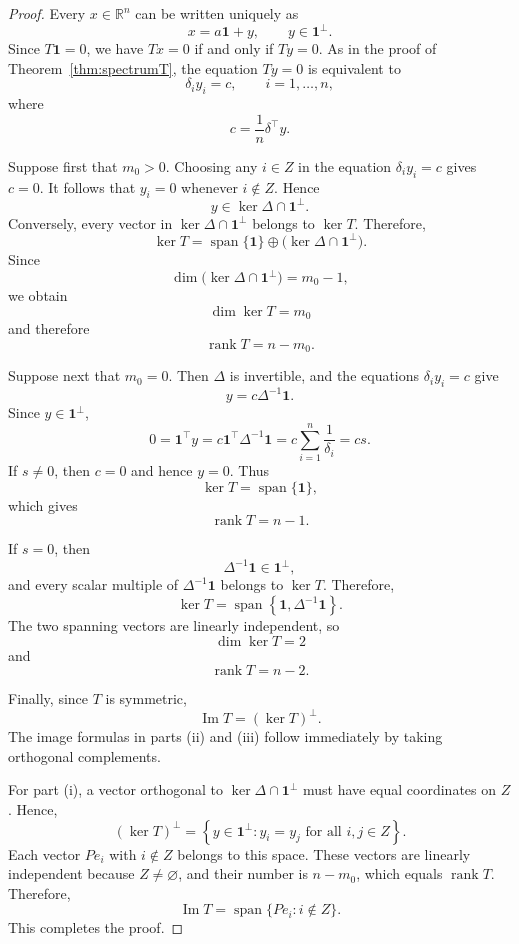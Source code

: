 \documentclass[12pt,a4paper]{amsart}
\theoremstyle{remark}
\theoremstyle{definition}
\newcommand{\1}{\mathbf{1}}
\newcommand{\0}{\mathbf{0}}
\begin{document}
\begin{proof}
Every $x\in\mathbb{R}^n$ can be written uniquely as
\[
x=a\mathbf{1}+y,
\qquad
y\in\mathbf{1}^{\perp}.
\]
Since $T\mathbf{1}=0$, we have $Tx=0$ if and only if $Ty=0$.
As in the proof of Theorem~\ref{thm:spectrumT}, the equation $Ty=0$
is equivalent to
\[
\delta_i y_i=c,
\qquad
i=1,\ldots,n,
\]
where
\[
c=\frac{1}{n}\delta^{\top}y.
\]

Suppose first that $m_0>0$. Choosing any $i\in Z$ in the equation
$\delta_i y_i=c$ gives $c=0$. It follows that $y_i=0$ whenever
$i\notin Z$. Hence
\[
y\in\ker\Delta\cap\mathbf{1}^{\perp}.
\]
Conversely, every vector in
$\ker\Delta\cap\mathbf{1}^{\perp}$ belongs to $\ker T$. Therefore,
\[
\ker T
=
\operatorname{span}\{\mathbf{1}\}
\oplus
\bigl(\ker\Delta\cap\mathbf{1}^{\perp}\bigr).
\]
Since
\[
\dim\bigl(\ker\Delta\cap\mathbf{1}^{\perp}\bigr)=m_0-1,
\]
we obtain
\[
\dim\ker T=m_0
\]
and therefore
\[
\operatorname{rank}T=n-m_0.
\]

Suppose next that $m_0=0$. Then $\Delta$ is invertible, and the
equations $\delta_i y_i=c$ give
\[
y=c\Delta^{-1}\mathbf{1}.
\]
Since $y\in\mathbf{1}^{\perp}$,
\[
0
=
\mathbf{1}^{\top}y
=
c\mathbf{1}^{\top}\Delta^{-1}\mathbf{1}
=
c\sum_{i=1}^{n}\frac{1}{\delta_i}
=
cs.
\]
If $s\neq 0$, then $c=0$ and hence $y=0$. Thus
\[
\ker T=\operatorname{span}\{\mathbf{1}\},
\]
which gives
\[
\operatorname{rank}T=n-1.
\]

If $s=0$, then
\[
\Delta^{-1}\mathbf{1}\in\mathbf{1}^{\perp},
\]
and every scalar multiple of $\Delta^{-1}\mathbf{1}$ belongs to
$\ker T$. Therefore,
\[
\ker T
=
\operatorname{span}
\left\{
\mathbf{1},\Delta^{-1}\mathbf{1}
\right\}.
\]
The two spanning vectors are linearly independent, so
\[
\dim\ker T=2
\]
and
\[
\operatorname{rank}T=n-2.
\]

Finally, since $T$ is symmetric,
\[
\operatorname{Im}T=(\ker T)^{\perp}.
\]
The image formulas in parts \textup{(ii)} and \textup{(iii)} follow
immediately by taking orthogonal complements.

For part \textup{(i)}, a vector orthogonal to
$\ker\Delta\cap\mathbf{1}^{\perp}$ must have equal coordinates on
$Z$. Hence,
\[
(\ker T)^{\perp}
=
\left\{
y\in\mathbf{1}^{\perp}:
y_i=y_j\text{ for all }i,j\in Z
\right\}.
\]
Each vector $Pe_i$ with $i\notin Z$ belongs to this space. These
vectors are linearly independent because $Z\neq\varnothing$, and
their number is $n-m_0$, which equals $\operatorname{rank}T$.
Therefore,
\[
\operatorname{Im}T
=
\operatorname{span}\{Pe_i:i\notin Z\}.
\]
This completes the proof.
\end{proof}
\end{document}

